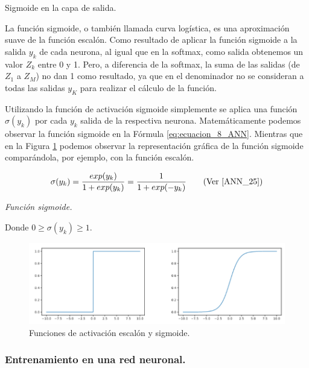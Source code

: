 \documentclass[12pt,a4paper]{article}
\makeatletter
\renewcommand\paragraph{\@startsection{paragraph}{4}{\z@}
            {-2.5ex\@plus -1ex \@minus -.25ex}
            {1.25ex \@plus .25ex}
            {\normalfont\normalsize\bfseries}}
\makeatother
\begin{document}
\begin{sloppypar}
\paragraph{Sigmoide en la capa de salida.}\label{sigm_capa_salida}

La función sigmoide, o también llamada curva logística, es una aproximación suave de la función escalón. Como resultado de aplicar la función sigmoide a la salida $y_k$ de cada neurona, al igual que en la softmax, como salida obtenemos un valor $Z_k$ entre 0 y 1. Pero, a diferencia de la softmax, la suma de las salidas (de $Z_1$ a $Z_M$) no dan 1 como resultado, ya que en el denominador no se consideran a todas las salidas $y_K$ para realizar el cálculo de la función. 

Utilizando la función de activación sigmoide simplemente se aplica una función $\sigma(y_k)$ por cada $y_k$ salida de la respectiva neurona. Matemáticamente podemos observar la función sigmoide en la Fórmula \ref{eq:ecuacion_8_ANN}. 
Mientras que en la Figura \ref{fig:ann_5} podemos observar la representación gráfica de la función sigmoide comparándola, por ejemplo, con la función escalón. 

\begin{equation}\label{eq:ecuacion_8_ANN}
\sigma(y_k)= \frac{exp(y_k)}{ {1 + exp(y_k)}} =  \frac{1}{ {1+exp(-y_k)}}    \qquad \text{(Ver \cite{ANN_25})}
\end{equation}
\begin{center}
\textit{Función sigmoide.}
\end{center}

Donde $0 \geq \sigma(y_k) \geq 1$.    

\begin{figure}[H]    %
 \centering
 \includegraphics[width=1\textwidth]{images/ANN/5-ANN.png}
 \caption{Funciones de activación escalón y sigmoide\cite{ANN_25}.} 
 \label{fig:ann_5}
\end{figure}

\subsubsection{Entrenamiento en una red neuronal.}\label{entren_ann}


\end{sloppypar}
\end{document}
